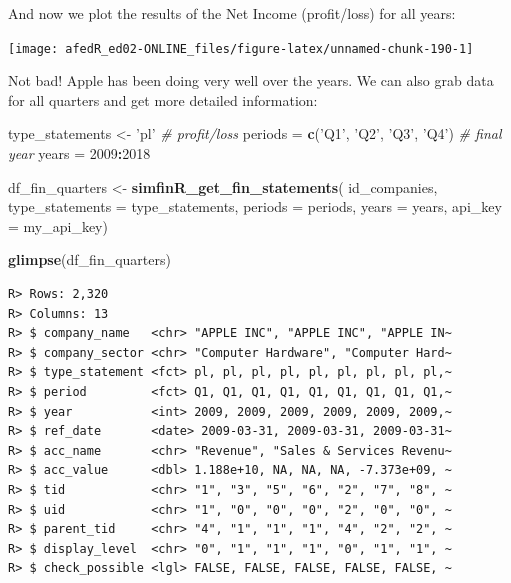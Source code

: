 \documentclass[
  12pt,
]{book}
\newenvironment{Shaded}{\begin{snugshade}}{\end{snugshade}}
\newcommand{\CommentTok}[1]{\textcolor[rgb]{0.37,0.37,0.37}{\textit{#1}}}
\newcommand{\DataTypeTok}[1]{\textcolor[rgb]{0.27,0.27,0.27}{#1}}
\newcommand{\DecValTok}[1]{\textcolor[rgb]{0.06,0.06,0.06}{#1}}
\newcommand{\KeywordTok}[1]{\textcolor[rgb]{0.27,0.27,0.27}{\textbf{#1}}}
\newcommand{\NormalTok}[1]{#1}
\newcommand{\OperatorTok}[1]{\textcolor[rgb]{0.43,0.43,0.43}{\textbf{#1}}}
\newcommand{\StringTok}[1]{\textcolor[rgb]{0.5,0.5,0.5}{#1}}
\begin{document}
And now we plot the results of the Net Income (profit/loss) for all years:

\begin{center}\texttt{[image: afedR\_ed02-ONLINE\_files/figure-latex/unnamed-chunk-190-1]} \end{center}

Not bad! Apple has been doing very well over the years. We can also grab data for all quarters and get more detailed information:

\begin{Shaded}
\begin{Highlighting}[]
\NormalTok{type_statements <-}\StringTok{ 'pl'} \CommentTok{# profit/loss}
\NormalTok{periods =}\StringTok{ }\KeywordTok{c}\NormalTok{(}\StringTok{'Q1'}\NormalTok{, }\StringTok{'Q2'}\NormalTok{, }\StringTok{'Q3'}\NormalTok{, }\StringTok{'Q4'}\NormalTok{) }\CommentTok{# final year}
\NormalTok{years =}\StringTok{ }\DecValTok{2009}\OperatorTok{:}\DecValTok{2018}

\NormalTok{df_fin_quarters <-}\StringTok{ }\KeywordTok{simfinR_get_fin_statements}\NormalTok{(}
\NormalTok{  id_companies,}
  \DataTypeTok{type_statements =}\NormalTok{ type_statements,}
  \DataTypeTok{periods =}\NormalTok{ periods,}
  \DataTypeTok{years =}\NormalTok{ years,}
  \DataTypeTok{api_key =}\NormalTok{ my_api_key)}

\KeywordTok{glimpse}\NormalTok{(df_fin_quarters)}
\end{Highlighting}
\end{Shaded}

\begin{verbatim}
R> Rows: 2,320
R> Columns: 13
R> $ company_name   <chr> "APPLE INC", "APPLE INC", "APPLE IN~
R> $ company_sector <chr> "Computer Hardware", "Computer Hard~
R> $ type_statement <fct> pl, pl, pl, pl, pl, pl, pl, pl, pl,~
R> $ period         <fct> Q1, Q1, Q1, Q1, Q1, Q1, Q1, Q1, Q1,~
R> $ year           <int> 2009, 2009, 2009, 2009, 2009, 2009,~
R> $ ref_date       <date> 2009-03-31, 2009-03-31, 2009-03-31~
R> $ acc_name       <chr> "Revenue", "Sales & Services Revenu~
R> $ acc_value      <dbl> 1.188e+10, NA, NA, NA, -7.373e+09, ~
R> $ tid            <chr> "1", "3", "5", "6", "2", "7", "8", ~
R> $ uid            <chr> "1", "0", "0", "0", "2", "0", "0", ~
R> $ parent_tid     <chr> "4", "1", "1", "1", "4", "2", "2", ~
R> $ display_level  <chr> "0", "1", "1", "1", "0", "1", "1", ~
R> $ check_possible <lgl> FALSE, FALSE, FALSE, FALSE, FALSE, ~
\end{verbatim}
\end{document}
